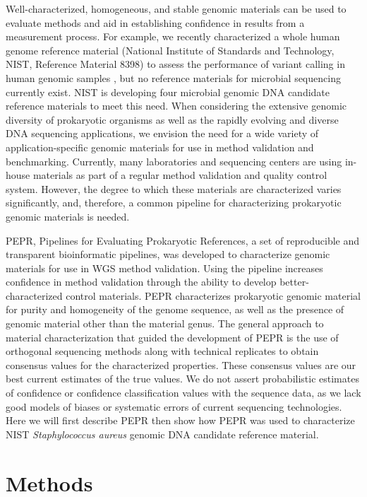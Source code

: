 \documentclass[smallextended]{svjour3}\usepackage[]{graphicx}\usepackage[]{color}
\begin{document}
Well-characterized, homogeneous, and stable genomic materials can be used to evaluate methods and aid in establishing confidence in results from a measurement process. 
For example, we recently characterized a whole human genome reference material (National Institute of Standards and Technology, NIST, Reference Material 8398) to assess the performance of variant calling in human genomic samples \cite{Zook2014}, but no reference materials for microbial sequencing currently exist. 
NIST is developing four microbial genomic DNA candidate reference materials to meet this need. 
When considering the extensive genomic diversity of prokaryotic organisms as well as the rapidly evolving and diverse DNA sequencing applications, we envision the need for a wide variety of application-specific genomic materials for use in method validation and benchmarking. 
Currently, many laboratories and sequencing centers are using in-house materials as part of a regular method validation and quality control system. 
However, the degree to which these materials are characterized varies significantly, and, therefore, a common pipeline for characterizing prokaryotic genomic materials is needed.  


PEPR, Pipelines for Evaluating Prokaryotic References, a set of reproducible and transparent bioinformatic pipelines, was developed to characterize genomic materials for use in WGS method validation. 
Using the pipeline increases confidence in method validation through the ability to develop better-characterized control materials. 
PEPR characterizes prokaryotic genomic material for purity and homogeneity of the genome sequence, as well as the presence of genomic material other than the material genus. 
The general approach to material characterization that guided the development of PEPR is the use of orthogonal sequencing methods along with technical replicates to obtain consensus values for the characterized properties. 
These consensus values are our best current estimates of the true values. 
We do not assert probabilistic estimates of confidence or confidence classification values with the sequence data, as we lack good models of biases or systematic errors of current sequencing technologies. 
Here we will first describe PEPR then show how PEPR was used to characterize NIST \textit{Staphylococcus aureus} genomic DNA candidate reference material.



\section{Methods}
\end{document}
